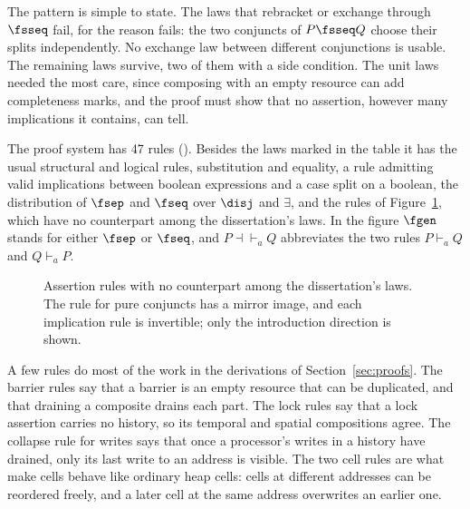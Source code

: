 The pattern is simple to state. The laws that rebracket or exchange
through $\fsseq$ fail, for the reason  fails: the two
conjuncts of $P \fsseq Q$ choose their splits independently. No exchange
law between different conjunctions is usable. The remaining laws survive,
two of them with a side condition. The unit laws needed the
most care, since composing with an empty resource can add completeness
marks, and the proof must show that no assertion, however many implications
it contains, can tell.

The proof system has 47 rules (). Besides the
laws marked in the table it has the usual structural and logical rules,
substitution and equality, a rule admitting valid implications between
boolean expressions and a case split on a boolean, the distribution of
$\fsep$ and $\fseq$ over $\disj$ and $\exists$, and the rules of
Figure~\ref{fig:assertion-rules}, which have no counterpart among the
dissertation's laws. In the figure $\fgen$ stands for either $\fsep$ or
$\fseq$, and $P \dashv\vdash_a Q$ abbreviates the two rules
$P \vdash_a Q$ and $Q \vdash_a P$.

\begin{figure}[!ht]
\small
{}
\caption{Assertion rules with no counterpart among the dissertation's
laws. The rule for pure conjuncts has a mirror image, and each implication
rule is invertible; only the introduction direction is shown.}
\label{fig:assertion-rules}
\end{figure}

A few rules do most of the work in the derivations of
Section~\ref{sec:proofs}. The barrier rules say that a barrier is an empty
resource that can be duplicated, and that draining a composite drains each
part. The lock rules say that a lock assertion carries no history, so its
temporal and spatial compositions agree. The collapse rule for writes says
that once a processor's writes in a history have drained, only its last
write to an address is visible. The two cell rules are what make cells behave like
ordinary heap cells: cells at different addresses can be reordered freely,
and a later cell at the same address overwrites an earlier one.

